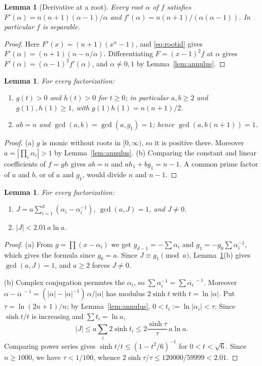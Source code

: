 \documentclass[11pt]{amsart}
\newtheorem{lemma}[theorem]{Lemma}
\theoremstyle{definition}
\theoremstyle{remark}
\numberwithin{equation}{section}
\begin{document}
\begin{lemma}[Derivative at a root]\label{lem:deriv}
Every root $\alpha$ of $f$ satisfies $F'(\alpha)=n(n+1)(\alpha-1)/\alpha$ and
$f'(\alpha)=n(n+1)/(\alpha(\alpha-1))$. In particular $f$ is separable.
\end{lemma}

\begin{proof}
Here $F'(x)=(n+1)(x^n-1)$, and \eqref{eq:rootid} gives
$F'(\alpha)=(n+1)(n-n/\alpha)$. Differentiating $F=(x-1)^2f$ at $\alpha$ gives
$F'(\alpha)=(\alpha-1)^2f'(\alpha)$, and $\alpha\ne0,1$ by
Lemma~\ref{lem:annulus}.
\end{proof}

\begin{lemma}\label{lem:basic}
For every factorization:
\begin{enumerate}
\item[(a)] $g(t)>0$ and $h(t)>0$ for $t\ge0$; in particular $a,b\ge2$ and
 $g(1),h(1)\ge1$, with $g(1)h(1)=n(n+1)/2$.
\item[(b)] $ab=n$ and $\gcd(a,b)=\gcd(a,g_1)=1$; hence $\gcd(a,b(n+1))=1$.
\end{enumerate}
\end{lemma}

\begin{proof}
(a) $g$ is monic without roots in $[0,\infty)$, so it is positive there.
Moreover $a=|\prod_i\alpha_i|>1$ by Lemma~\ref{lem:annulus}.
(b) Comparing the constant and linear coefficients of $f=gh$ gives
$ab=n$ and $ah_1+bg_1=n-1$. A common prime factor of $a$ and $b$, or of
$a$ and $g_1$, would divide $n$ and $n-1$.
\end{proof}

\begin{lemma}\label{lem:J}
For every factorization:
\begin{enumerate}
\item[(a)] $J=a\sum_{i=1}^d(\alpha_i-\alpha_i^{-1})$, $\gcd(a,J)=1$, and
 $J\ne0$.
\item[(b)] $|J|<2.01\,a\ln a$.
\end{enumerate}
\end{lemma}

\begin{proof}
(a) From $g=\prod(x-\alpha_i)$ we get $g_{d-1}=-\sum\alpha_i$ and
$g_1=-g_0\sum\alpha_i^{-1}$, which gives the formula since $g_0=a$. Since
$J\equiv g_1\pmod a$, Lemma~\ref{lem:basic}(b) gives $\gcd(a,J)=1$, and
$a\ge2$ forces $J\ne0$.

(b) Complex conjugation permutes the $\alpha_i$, so
$\sum\alpha_i^{-1}=\sum\overline{\alpha_i}^{\,-1}$. Moreover
$\alpha-\overline\alpha^{\,-1}=(|\alpha|-|\alpha|^{-1})\,\alpha/|\alpha|$
has modulus $2\sinh t$ with $t=\ln|\alpha|$. Put $\tau=\ln(2n+1)/n$; by
Lemma~\ref{lem:annulus}, $0<t_i:=\ln|\alpha_i|<\tau$. Since
$\sinh t/t$ is increasing and $\sum t_i=\ln a$,
\[
 |J|\le a\sum_i2\sinh t_i\le 2\frac{\sinh\tau}{\tau}\,a\ln a .
\]
Comparing power series gives $\sinh t/t\le(1-t^2/6)^{-1}$ for $0<t<\sqrt6$.
Since $n\ge1000$, we have $\tau<1/100$, whence
$2\sinh\tau/\tau\le120000/59999<2.01$.
\end{proof}
\end{document}

